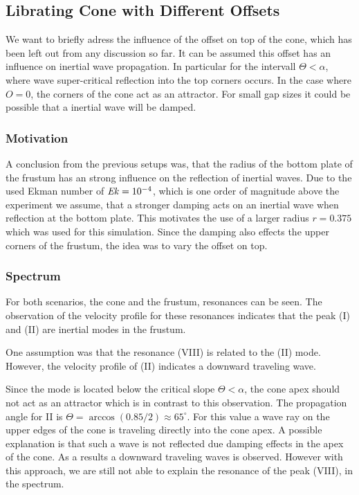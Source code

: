 {\subsection{Librating Cone with Different Offsets}

We want to briefly adress the influence of the offset on top of the cone,
which has been left out from any discussion so far.
It can be assumed this offset has an influence on inertial wave propagation.
In particular for the intervall $\Theta<\alpha$, where wave super-critical reflection into the top corners occurs.
In the case where $O=0$, the corners of the cone act as an attractor.
For small gap sizes it could be possible that a inertial wave will be damped.

\subsubsection{Motivation}

A conclusion from the previous setups was,
that the radius of the bottom plate of the frustum has an strong
influence on the reflection of inertial waves.
Due to the used Ekman number of $\mbox{\textit{Ek}}=10^{-4}$,
which is one order of magnitude above the experiment we assume,
that a stronger damping acts on an inertial wave when reflection at the bottom plate.
This motivates the use of a larger radius $r=0.375$ which was used for this simulation.
Since the damping also effects the upper corners of the frustum, the idea was
to vary the offset on top.

\subsubsection{Spectrum}

For both scenarios, the cone and the frustum, resonances can be seen.
The observation of the velocity profile for these resonances indicates that
the peak (\RN{1}) and (\RN{2}) are inertial modes in the frustum.

One assumption was that the resonance (\RN{8}) is related to the (\RN{2}) mode.
However, the velocity profile of (\RN{2}) indicates a downward traveling wave.

Since the mode is located below the critical slope $\Theta < \alpha$, the cone apex
should not act as an attractor which is in contrast to this observation.
The propagation angle for \RN{2} is $\Theta=\arccos(0.85/2)\approx65^\circ$.
For this value a wave ray on the upper edges of the cone is traveling directly
into the cone apex.
A possible explanation is that such a wave is not reflected due damping effects in
the apex of the cone. As a results a downward traveling waves is observed.
However with this approach, we are still not able to explain the resonance of the peak (\RN{8}),
in the spectrum.

}
